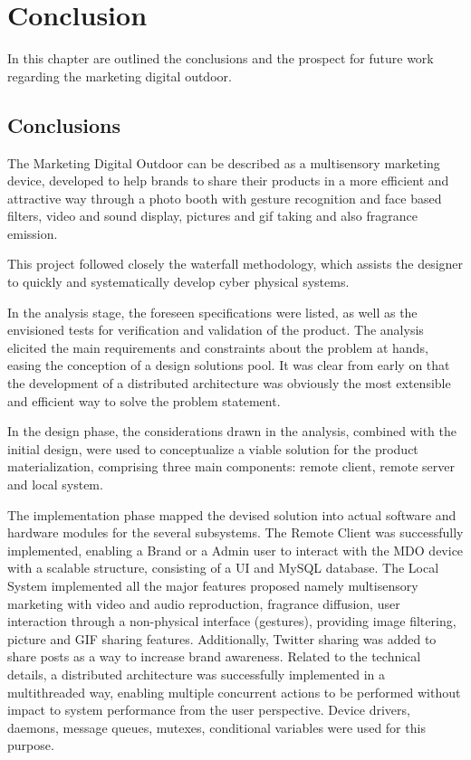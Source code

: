 \chapter{Conclusion}%
\label{ch:conclusion}
In this chapter are outlined the conclusions and the prospect for future work
regarding the marketing digital outdoor.
%
\section{Conclusions}%
\label{ch:conclusion-concls}
The Marketing Digital Outdoor can be described as a multisensory marketing device, developed to help
brands to share their products in a more efficient and attractive way through a
photo booth with gesture recognition and face based filters, video and sound
display, pictures and gif taking and also fragrance emission.

This project followed closely the waterfall methodology, which assists the
designer to quickly and systematically develop cyber physical systems.

In the analysis stage, the foreseen specifications were listed, as well as the
envisioned tests for verification and validation of the product.
The analysis elicited the main requirements and constraints about the problem at
hands, easing the conception of a design solutions pool. It was clear from early
on that the development of a distributed architecture was obviously the most
extensible and efficient way to solve the problem statement.

In the design phase, the considerations drawn in the analysis, combined with the
initial design, were used to conceptualize a viable solution for the product
materialization, comprising three main components: remote client, remote
server and local system. 

The implementation phase mapped the devised solution into actual software and
hardware modules for the several subsystems. The Remote Client was successfully
implemented, enabling a Brand or a Admin user to interact with the MDO device
with a scalable structure, consisting of a UI and MySQL database. The Local
System implemented all the major features proposed namely multisensory marketing
with video and audio
reproduction, fragrance diffusion, user interaction through a non-physical
interface (gestures), providing image filtering, picture and GIF sharing
features. Additionally, Twitter sharing was added to share posts as a way to increase
brand awareness.
Related to the technical details, a distributed architecture was successfully
implemented in a multithreaded way, enabling multiple concurrent actions to be
performed without impact to system performance from the user perspective. Device
drivers, daemons, message queues, mutexes, conditional variables were used for
this purpose.


